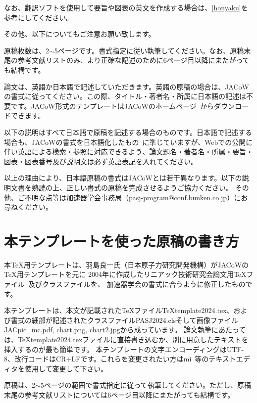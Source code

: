 \documentclass{PASJ2024}
\begin{document}
なお、翻訳ソフトを使用して要旨や図表の英文を作成する場合は、\ref{honyaku}を参考にしてください。

その他、以下についてもご注意お願い致します。
%
\begin{Itemize}
%
\item{原稿枚数は、2$\sim$5ページです。書式指定に従い執筆してください。なお、原稿末尾の参考文献リストのみ、より正確な記述のために6ページ目以降にまたがっても結構です。}
%
\end{Itemize}

論文は、英語か日本語で記述していただきます。英語の原稿の場合は、JACoWの書式に従ってください。この際、タイトル・著者名・所属に日本語の記述は不要です。JACoW形式のテンプレートはJACoWのホームページ~\cite{Reference_JACoW_Word,Reference_JACoW_TeX}からダウンロードできます。

以下の説明はすべて日本語で原稿を記述する場合のものです。日本語で記述する場合も、JACoWの書式を日本語化したもの~\cite{Reference_1,Reference_1_URL,T_Tanaka}に準じていますが、Webでの公開に伴い英語による検索・参照に対応できるよう、論文題名・著者名・所属・要旨・図表・図表番号及び説明文は必ず英語表記を入れてください。

以上の理由により、日本語原稿の書式はJACoWとは若干異なります。以下の説明文書を熟読の上、正しい書式の原稿を完成させるようご協力ください。
その他、ご不明な点等は加速器学会事務局（pasj-program@conf.bunken.co.jp）にお尋ねください。
%
\section{本テンプレートを使った原稿の書き方}
本{\TeX}用テンプレートは、羽島良一氏（日本原子力研究開発機構）がJACoWの{\TeX}用テンプレートを元に
2004年に作成したリニアック技術研究会論文用{\TeX}ファイル~\cite{Reference_2}及びクラスファイルを、
加速器学会の書式に合うように修正したものです。

本テンプレートは、本文が記載された{\TeX}ファイルTeXtemplate2024.tex、および書式の細部が記述されたクラスファイルPASJ2024.clsそして画像ファイルJACpic\_mc.pdf, chart.png, chart2.jpgから成っています。
論文執筆にあたっては、TeXtemplate2024.texファイルに直接書き込むか、別に用意したテキストを挿入するのが最も簡単です。
本テンプレートの文字エンコーディングはUTF-8、改行コードはCR+LFです。これらを変更されたい方はmi~\cite{mi}等のテキストエディタを使用して変更して下さい。

原稿は、2$\sim$5ページの範囲で書式指定に従って執筆してください。ただし、原稿末尾の参考文献リストについては6ページ目以降にまたがっても結構です。
\end{document}
